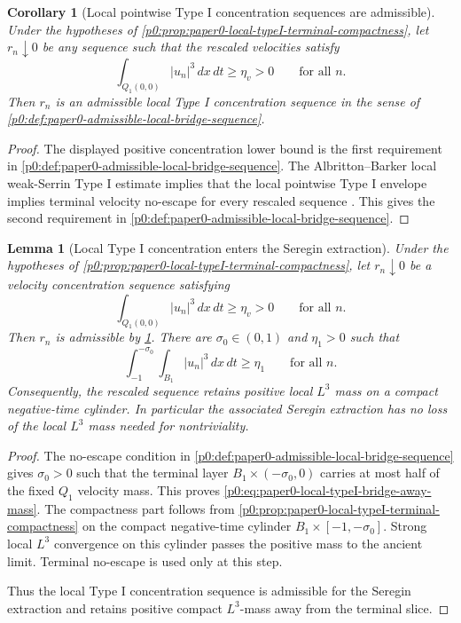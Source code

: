 \documentclass[11pt]{amsart}
\theoremstyle{plain}
\newtheorem{lemma}[lemma]{Lemma}
\newtheorem{corollary}[corollary]{Corollary}
\theoremstyle{definition}
\theoremstyle{remark}
\numberwithin{equation}{section}
\begin{document}
\begin{corollary}[Local pointwise Type I concentration sequences are admissible]
\label{p0:cor:paper0-local-typeI-bridge-admissible}
Under the hypotheses of
\cref{p0:prop:paper0-local-typeI-terminal-compactness}, let \(r_n\downarrow0\) be
any sequence such that the rescaled velocities satisfy
\[
  \int_{Q_1(0,0)} |u_n|^3\,dx\,dt\ge\eta_v>0
  \qquad\text{for all }n .
\]
Then \(r_n\) is an admissible local Type I concentration sequence in the sense of
\cref{p0:def:paper0-admissible-local-bridge-sequence}.
\end{corollary}

\begin{proof}
The displayed positive concentration lower bound is the first requirement in
\cref{p0:def:paper0-admissible-local-bridge-sequence}.  The Albritton--Barker
local weak-Serrin Type I estimate implies
that the local pointwise Type I envelope implies terminal velocity no-escape
for every rescaled sequence
\cite{AlbrittonBarker2019}.  This gives the second requirement in
\cref{p0:def:paper0-admissible-local-bridge-sequence}.
\end{proof}

\begin{lemma}[Local Type I concentration enters the Seregin extraction]
\label{p0:lem:paper0-local-typeI-into-terminal-dichotomy}
Under the hypotheses of
\cref{p0:prop:paper0-local-typeI-terminal-compactness}, let \(r_n\downarrow0\) be
a velocity concentration sequence satisfying
\[
  \int_{Q_1(0,0)} |u_n|^3\,dx\,dt\ge\eta_v>0
  \qquad\text{for all }n .
\]
Then \(r_n\) is admissible by
\cref{p0:cor:paper0-local-typeI-bridge-admissible}.  There are
\(\sigma_0\in(0,1)\) and \(\eta_1>0\) such that
\begin{equation}\label{p0:eq:paper0-local-typeI-bridge-away-mass}
  \int_{-1}^{-\sigma_0}\int_{B_1}|u_n|^3\,dx\,dt\ge\eta_1
  \qquad\text{for all }n.
\end{equation}
Consequently, the rescaled sequence retains positive local \(L^3\) mass on a
compact negative-time cylinder.  In particular the associated Seregin
extraction has no loss of the local \(L^3\) mass needed for
nontriviality.
\end{lemma}

\begin{proof}
The no-escape condition in
\cref{p0:def:paper0-admissible-local-bridge-sequence} gives \(\sigma_0>0\) such
that the terminal layer \(B_1\times(-\sigma_0,0)\) carries at most half of the
fixed \(Q_1\) velocity mass.  This proves
\eqref{p0:eq:paper0-local-typeI-bridge-away-mass}.  The compactness part follows
from \cref{p0:prop:paper0-local-typeI-terminal-compactness} on the compact
negative-time cylinder \(B_1\times[-1,-\sigma_0]\).  Strong local \(L^3\)
convergence on this cylinder passes the positive mass to the ancient limit.
Terminal no-escape is used only at this step.

Thus the local Type I concentration sequence is admissible for the Seregin
extraction and retains positive compact \(L^3\)-mass away from the terminal
slice.
\end{proof}
\end{document}
